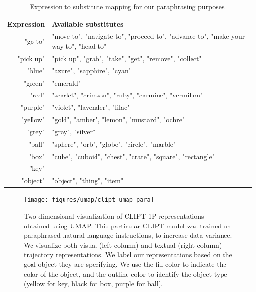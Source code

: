 \documentclass[../main.tex]{subfiles}
\begin{document}
\begingroup
\renewcommand{\arraystretch}{1.5}
\begin{table}[tb]
	\centering
	\caption[Expression to substitute mapping for paraphrasing purposes.]{Expression to substitute
		mapping for our paraphrasing purposes.}
	\label{tab:synonyms}
	\begin{tabularx}{\textwidth}{@{}rX@{}}
		\toprule
		\textbf{Expression} & \textbf{Available substitutes}                                                      \\ \midrule
		"go to"             & "move to", "navigate to", "proceed to", "advance to", "make your way to", "head to" \\
		"pick up"           & "pick up", "grab", "take", "get", "remove", "collect"                               \\
		"blue"              & "azure", "sapphire", "cyan"                                                         \\
		"green"             & "emerald"                                                                           \\
		"red"               & "scarlet", "crimson", "ruby", "carmine", "vermilion"                                \\
		"purple"            & "violet", "lavender", "lilac"                                                       \\
		"yellow"            & "gold", "amber", "lemon", "mustard", "ochre"                                        \\
		"grey"              & "gray", "silver"                                                                    \\
		"ball"              & "sphere", "orb", "globe", "circle", "marble"                                        \\
		"box"               & "cube", "cuboid", "chest", "crate", "square", "rectangle"                           \\
		"key"               & -                                                                                   \\
		"object"            & "object", "thing", "item"                                                           \\ \bottomrule
	\end{tabularx}
\end{table}
\endgroup

\begin{figure}[t]
	\centering
	\texttt{[image: figures/umap/clipt-umap-para]}
	\caption[Visualization of CLIPT representations with UMAP (Paraphrased)]{Two-dimensional
		visualization of CLIPT-1P representations obtained using UMAP. This particular CLIPT model was
		trained on paraphrased natural language instructions, to increase data variance. We visualize
		both visual (left column) and textual (right column) trajectory representations. We label our
		representations based on the goal object they are specifying. We use the fill color to indicate
		the color of the object, and the outline color to identify the object type (yellow for key, black
		for box, purple for ball).}
	\label{fig:clipt-umap-para}
\end{figure}
\end{document}
